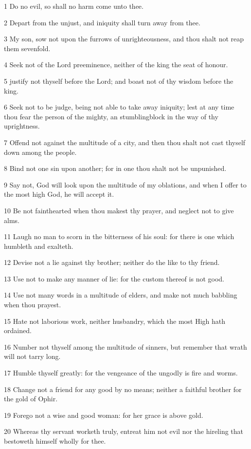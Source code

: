 \par 1 Do no evil, so shall no harm come unto thee.
\par 2 Depart from the unjust, and iniquity shall turn away from thee.
\par 3 My son, sow not upon the furrows of unrighteousness, and thou shalt not reap them sevenfold.
\par 4 Seek not of the Lord preeminence, neither of the king the seat of honour.
\par 5 justify not thyself before the Lord; and boast not of thy wisdom before the king.
\par 6 Seek not to be judge, being not able to take away iniquity; lest at any time thou fear the person of the mighty, an stumblingblock in the way of thy uprightness.
\par 7 Offend not against the multitude of a city, and then thou shalt not cast thyself down among the people.
\par 8 Bind not one sin upon another; for in one thou shalt not be unpunished.
\par 9 Say not, God will look upon the multitude of my oblations, and when I offer to the most high God, he will accept it.
\par 10 Be not fainthearted when thou makest thy prayer, and neglect not to give alms.
\par 11 Laugh no man to scorn in the bitterness of his soul: for there is one which humbleth and exalteth.
\par 12 Devise not a lie against thy brother; neither do the like to thy friend.
\par 13 Use not to make any manner of lie: for the custom thereof is not good.
\par 14 Use not many words in a multitude of elders, and make not much babbling when thou prayest.
\par 15 Hate not laborious work, neither husbandry, which the most High hath ordained.
\par 16 Number not thyself among the multitude of sinners, but remember that wrath will not tarry long.
\par 17 Humble thyself greatly: for the vengeance of the ungodly is fire and worms.
\par 18 Change not a friend for any good by no means; neither a faithful brother for the gold of Ophir.
\par 19 Forego not a wise and good woman: for her grace is above gold.
\par 20 Whereas thy servant worketh truly, entreat him not evil nor the hireling that bestoweth himself wholly for thee.
